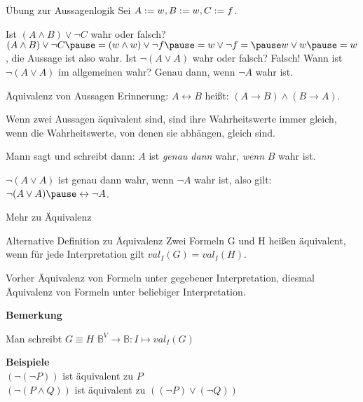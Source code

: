 \documentclass[handout]{beamer}
\begin{document}
\begin{frame}{Übung zur Aussagenlogik}
	\pause Sei $A := w, B := w, C := f$.
	
	\begin{itemize}
		\pitem Ist $(A \land B) \lor \lnot C$ wahr oder falsch? \pause $(A \land B) \lor \lnot C \pause = (\W \land \W) \lor \lnot \F \pause = \W \lor \lnot \F = \pause \W \lor \W \pause = \W$\pause , die Aussage ist also wahr.
		\pitem Ist $\lnot (A \lor A)$ wahr oder falsch? \pause Falsch! \pause Wann ist $\lnot (A \lor A)$ im allgemeinen wahr? \pause Genau dann, wenn $\lnot A$ wahr ist.
	\end{itemize}

	\pause

	\begin{block}{Äquivalenz von Aussagen}
		Erinnerung: \pause $A \leftrightarrow B$ heißt: \pause $(A \rightarrow B) \land (B \rightarrow A)$. 
		
		\pause Wenn zwei Aussagen äquivalent sind, sind ihre Wahrheitswerte immer gleich\pause , wenn die Wahrheitswerte, von denen sie abhängen, gleich sind. 
		
		\pause Mann sagt und schreibt dann: \pause $A$ ist \emph{genau dann} wahr, \emph{wenn} $B$ wahr ist.
	\end{block}

	\begin{itemize}
		\pitem $\lnot (A \lor A)$ ist genau dann wahr\pause , wenn $\lnot A$ wahr ist\pause , also gilt:  $\lnot (A \lor A) \pause \leftrightarrow \lnot A$. 
	\end{itemize}
\end{frame}

\begin{frame}{Mehr zu Äquivalenz}
\pause
	\begin{block}{Alternative Definition zu Äquivalenz}
		Zwei Formeln G und H heißen äquivalent, wenn für jede Interpretation gilt $val_I(G) = val_I(H)$.
	\end{block}\pause

	Vorher Äquivalenz von Formeln unter gegebener Interpretation\pause , diesmal Äquivalenz von Formeln unter beliebiger Interpretation.\pause

	\textbf{Bemerkung}\\
	\begin{itemize}
		\pitem Man schreibt $G \equiv  H$
		\pitem $\mathbb{B}^V \rightarrow \mathbb{B}: I \mapsto val_I(G)$
	\end{itemize}\pause
	\textbf{Beispiele}\\\pause
	$(\lnot(\lnot P))$ ist äquivalent zu $P$\\\pause
	$(\lnot(P\land Q))$ ist äquivalent zu $((\lnot P) \lor (\lnot Q))$
\end{frame}
\end{document}
